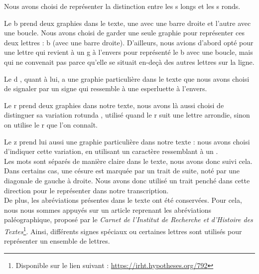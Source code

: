 \documentclass{article}
\begin{document}
Nous avons choisi de représenter la distinction entre les \og s \fg\hspace{0.5mm}  longs et les \og s \fg\hspace{0.5mm}  ronds. 

Le \og b \fg\hspace{0.5mm}  prend deux graphies dans le texte, une avec une barre droite et l'autre avec une boucle. Nous avons choisi de garder une seule graphie pour représenter ces deux lettres : \og b \fg\hspace{0.5mm} (avec une barre droite). D'ailleurs, nous avions d'abord opté pour une lettre qui revient à un \og g \fg\hspace{0.5mm} à l'envers pour représenté le b avec une boucle, mais qui ne convenait pas parce qu'elle se situait en-deçà des autres lettres sur la ligne. 

Le \og d \fg\hspace{0.5mm}, quant à lui, a une graphie particulière dans le texte que nous avons choisi de signaler par un signe qui ressemble à une esperluette à l'envers. 

Le  \og r \fg\hspace{0.5mm} prend deux graphies dans notre texte, nous avons là aussi choisi de distinguer sa variation \og rotunda \fg\hspace{0.5mm}, utilisé quand le \og r \fg\hspace{0.5mm} suit une lettre arrondie, sinon on utilise le \og r \fg\hspace{0.5mm} que l'on connaît. 

Le \og z \fg\hspace{0.5mm} prend lui aussi une graphie particulière dans notre texte : nous avons choisi d'indiquer cette variation, en utilisant un caractère ressemblant à un  \fg\hspace{0.5mm}.\\

Les mots sont séparés de manière claire dans le texte, nous avons donc suivi cela. Dans certains cas, une césure est marquée par un trait de suite, noté par une diagonale de gauche à droite. Nous avons donc utilisé un trait penché dans cette direction pour le représenter dans notre transcription.\\

De plus, les abréviations présentes dans le texte ont été conservées. Pour cela, nous nous sommes appuyés sur un article reprenant les abréviations paléographique, proposé par le \textit{Carnet de l'Institut de Recherche et d'Histoire des Textes}\footnote{Disponible sur le lien suivant : \url{https://irht.hypotheses.org/792}}. Ainsi, différents signes spéciaux ou certaines lettres sont utilisés pour représenter un ensemble de lettres. 
\end{document}
